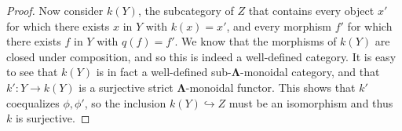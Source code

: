 \documentclass{amsbook} %
\newcommand{\ML}{\mathbf{\Lambda}}
\newenvironment{eq*}{\begin{equation*}}{\end{equation*}}
\numberwithin{section}{chapter}
\begin{document}
\begin{proof}
Now consider $k(Y)$, the subcategory of $Z$ that contains every object $x'$ for which there exists $x$ in $Y$ with $k(x) = x'$, and every morphism $f'$ for which there exists $f$ in $Y$ with $q(f) = f'$. We know that the morphisms of $k(Y)$ are closed under composition, and so this is indeed a well-defined category. It is easy to see that $k(Y)$ is in fact a well-defined sub-$\ML$-monoidal category, and that $k': Y \to k(Y)$ is a surjective strict $\ML$-monoidal functor. This shows that $k'$ coequalizes $\phi, \phi'$, so the inclusion $k(Y) \hookrightarrow Z$ must be an isomorphism and thus $k$ is surjective.


\end{proof}
\end{document}
